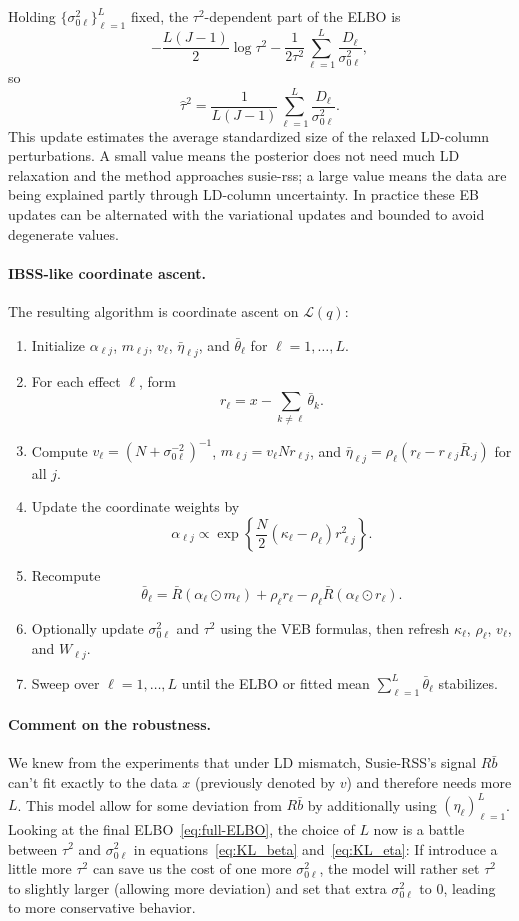 \documentclass[11pt]{article}
\begin{document}
Holding $\{\sigma_{0\ell}^2\}_{\ell=1}^L$ fixed, the $\tau^2$-dependent part of
the ELBO is
\[
-\frac{L(J-1)}{2}\log\tau^2
-\frac{1}{2\tau^2}
\sum_{\ell=1}^L\frac{D_\ell}{\sigma_{0\ell}^2},
\]
so
\[
\hat\tau^2
=
\frac{1}{L(J-1)}
\sum_{\ell=1}^L\frac{D_\ell}{\sigma_{0\ell}^2}.
\]
This update estimates the average standardized size of the relaxed LD-column
perturbations. A small value means the posterior does not need much LD
relaxation and the method approaches susie-rss; a large value means the data
are being explained partly through LD-column uncertainty. In practice these EB
updates can be alternated with the variational updates and bounded to avoid
degenerate values.

\paragraph{IBSS-like coordinate ascent.}
The resulting algorithm is coordinate ascent on $\mathcal L(q)$:
\begin{enumerate}[leftmargin=*]
\item Initialize $\alpha_{\ell j}$, $m_{\ell j}$, $v_\ell$,
$\bar\eta_{\ell j}$, and $\bar\theta_\ell$ for $\ell=1,\ldots,L$.
\item For each effect $\ell$, form
\[
r_\ell=x-\sum_{k\ne\ell}\bar\theta_k.
\]
\item Compute $v_\ell=(N+\sigma_{0\ell}^{-2})^{-1}$,
$m_{\ell j}=v_\ell Nr_{\ell j}$, and
$\bar\eta_{\ell j}=\rho_\ell(r_\ell-r_{\ell j}\bar R_{\cdot j})$ for all $j$.
\item Update the coordinate weights by
\[
\alpha_{\ell j}
\propto
\exp\!\left\{
\frac{N}{2}(\kappa_\ell-\rho_\ell)r_{\ell j}^2
\right\}.
\]
\item Recompute
\[
\bar\theta_\ell
=
\bar R(\alpha_\ell\odot m_\ell)
+\rho_\ell r_\ell
-\rho_\ell\bar R(\alpha_\ell\odot r_\ell).
\]
\item Optionally update $\sigma_{0\ell}^2$ and $\tau^2$ using the VEB formulas,
then refresh $\kappa_\ell$, $\rho_\ell$, $v_\ell$, and $W_{\ell j}$.
\item Sweep over $\ell=1,\ldots,L$ until the ELBO or fitted mean
$\sum_{\ell=1}^L\bar\theta_\ell$ stabilizes.
\end{enumerate}

\paragraph{Comment on the robustness.} We knew from the experiments that under LD mismatch, Susie-RSS's signal $R \bar{b}$ can't fit exactly to the data $x$ (previously denoted by $v$) and therefore needs more $L$. This model allow for some deviation from $R \bar{b}$ by additionally using $(\eta_{\ell})_{\ell = 1}^{L}$. Looking at the final ELBO~\eqref{eq:full-ELBO}, the choice of $L$ now is a battle between $\tau^2$ and $\sigma_{0\ell}^2$ in equations~\eqref{eq:KL_beta} and~\eqref{eq:KL_eta}: If introduce a little more $\tau^2$ can save us the cost of one more $\sigma_{0\ell}^2$, the model will rather set $\tau^2$ to slightly larger (allowing more deviation) and set that extra $\sigma_{0\ell}^2$ to 0, leading to more conservative behavior.
\end{document}
